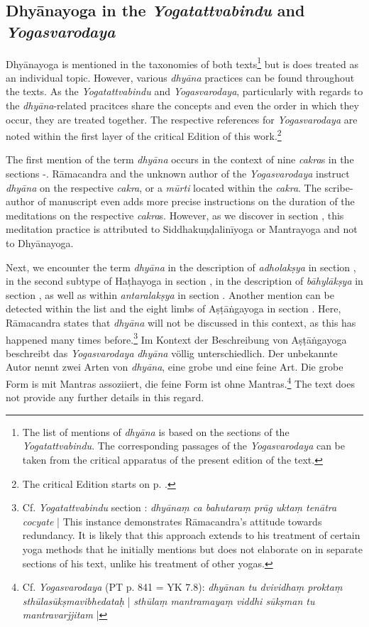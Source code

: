 \subsection{Dhyānayoga in the \textit{Yogatattvabindu} and \textit{Yogasvarodaya}}
\label{ramacandradhyana}
Dhyānayoga is mentioned in the taxonomies of both texts\footnote{The list of mentions of \textit{dhyāna} is based on the sections of the \textit{Yogatattvabindu}. The corresponding passages of the \textit{Yogasvarodaya} can be taken from the critical apparatus of the present edition of the text.} but is does treated as an individual topic. However, various \textit{dhyāna} practices can be found throughout the texts. As the \textit{Yogatattvabindu} and \textit{Yogasvarodaya}, particularly with regards to the \textit{dhyāna}-related pracitces share the concepts and even the order in which they occur, they are treated together. The respective references for \textit{Yogasvarodaya} are noted within the first layer of the critical Edition of this work.\footnote{The critical Edition starts on p. \pageref{intro}.} 

The first mention of the term \textit{dhyāna} occurs in the context of nine \textit{cakra}s in the sections -. Rāmacandra and the unknown author of the \textit{Yogasvarodaya} instruct \textit{dhyāna} on the respective \textit{cakra}, or a \textit{mūrti} located within the \textit{cakra}. The scribe-author of manuscript  even adds more precise instructions on the duration of the meditations on the respective \textit{cakra}s. However, as we discover in section , this meditation practice is attributed to Siddhakuṇḍalinīyoga or Mantrayoga and not to Dhyānayoga.

Next, we encounter the term \textit{dhyāna} in the description of \textit{adholakṣya} in section , in the second subtype of Haṭhayoga in section , in the description of \textit{bāhylākṣya} in section , as well as within \textit{antaralakṣya} in section . Another mention can be detected within the list and the eight limbs of Aṣṭāṅgayoga in section . Here, Rāmacandra states that \textit{dhyāna} will not be discussed in this context, as this has happened many times before.\footnote{Cf. \textit{Yogatattvabindu} section : \textit{dhyānaṃ ca bahutaraṃ prāg uktaṃ tenātra cocyate} | This instance demonstrates Rāmacandra's attitude towards redundancy. It is likely that this approach extends to his treatment of certain yoga methods that he initially mentions but does not elaborate on in separate sections of his text, unlike his treatment of other yogas.} Im Kontext der Beschreibung von Aṣṭāṅgayoga beschreibt das \emph{Yogasvarodaya} \textit{dhyāna} völlig unterschiedlich. Der unbekannte Autor nennt zwei Arten von \textit{dhyāna}, eine grobe und eine feine Art. Die grobe Form is mit Mantras assoziiert, die feine Form ist ohne Mantras.\footnote{Cf. \emph{Yogasvarodaya} (PT p. 841 = YK 7.8): \textit{dhyānan tu dvividhaṃ proktaṃ sthūlasūkṣmavibhedataḥ} | \textit{sthūlaṃ mantramayaṃ viddhi sūkṣman tu mantravarjjitam} |} The text does not provide any further details in this regard.

